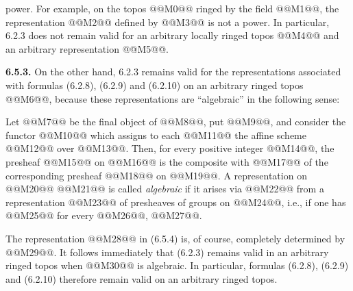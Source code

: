 
power. For example, on the topos @@M0@@ ringed by the field @@M1@@, the representation @@M2@@ defined by
@@M3@@
is not a power. In particular, 6.2.3 does not remain valid for an arbitrary locally ringed topos @@M4@@ and an arbitrary representation @@M5@@.

\textbf{6.5.3.} On the other hand, 6.2.3 remains valid for the representations associated with formulas (6.2.8), (6.2.9) and (6.2.10) on an arbitrary ringed topos @@M6@@, because these representations are ``algebraic'' in the following sense:

Let @@M7@@ be the final object of @@M8@@, put @@M9@@, and consider the functor
@@M10@@
which assigns to each @@M11@@ the affine scheme @@M12@@ over @@M13@@. Then, for every positive integer @@M14@@, the presheaf @@M15@@ on @@M16@@ is the composite with @@M17@@ of the corresponding presheaf @@M18@@ on @@M19@@. A representation on @@M20@@
@@M21@@
is called \emph{algebraic} if it arises via @@M22@@ from a representation
@@M23@@
of presheaves of groups on @@M24@@, i.e., if one has
@@M25@@
for every @@M26@@, @@M27@@.

The representation @@M28@@ in (6.5.4) is, of course, completely determined by @@M29@@. It follows immediately that (6.2.3) remains valid in an arbitrary ringed topos when @@M30@@ is algebraic. In particular, formulas (6.2.8), (6.2.9) and (6.2.10) therefore remain valid on an arbitrary ringed topos.
